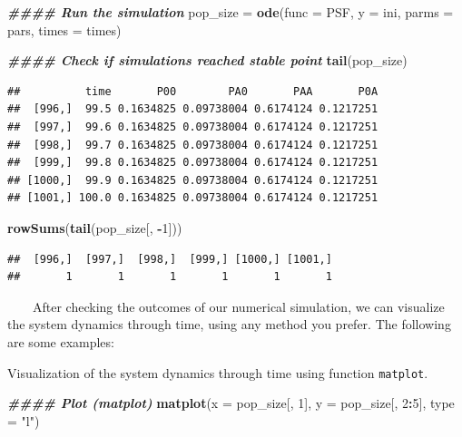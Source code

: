 \documentclass[
]{book}
\newenvironment{Shaded}{\begin{snugshade}}{\end{snugshade}}
\newcommand{\AttributeTok}[1]{\textcolor[rgb]{0.13,0.29,0.53}{#1}}
\newcommand{\DecValTok}[1]{\textcolor[rgb]{0.00,0.00,0.81}{#1}}
\newcommand{\DocumentationTok}[1]{\textcolor[rgb]{0.56,0.35,0.01}{\textbf{\textit{#1}}}}
\newcommand{\FunctionTok}[1]{\textcolor[rgb]{0.13,0.29,0.53}{\textbf{#1}}}
\newcommand{\NormalTok}[1]{#1}
\newcommand{\OtherTok}[1]{\textcolor[rgb]{0.56,0.35,0.01}{#1}}
\newcommand{\SpecialCharTok}[1]{\textcolor[rgb]{0.81,0.36,0.00}{\textbf{#1}}}
\newcommand{\StringTok}[1]{\textcolor[rgb]{0.31,0.60,0.02}{#1}}
\begin{document}
\begin{Shaded}
\begin{Highlighting}[]
\DocumentationTok{\#\#\#\# Run the simulation}
\NormalTok{pop\_size }\OtherTok{=} \FunctionTok{ode}\NormalTok{(}\AttributeTok{func =}\NormalTok{ PSF, }\AttributeTok{y =}\NormalTok{ ini, }\AttributeTok{parms =}\NormalTok{ pars, }\AttributeTok{times =}\NormalTok{ times)}


\DocumentationTok{\#\#\#\# Check if simulations reached stable point }
\FunctionTok{tail}\NormalTok{(pop\_size)}
\end{Highlighting}
\end{Shaded}

\begin{verbatim}
##          time       P00        PA0       PAA       P0A
##  [996,]  99.5 0.1634825 0.09738004 0.6174124 0.1217251
##  [997,]  99.6 0.1634825 0.09738004 0.6174124 0.1217251
##  [998,]  99.7 0.1634825 0.09738004 0.6174124 0.1217251
##  [999,]  99.8 0.1634825 0.09738004 0.6174124 0.1217251
## [1000,]  99.9 0.1634825 0.09738004 0.6174124 0.1217251
## [1001,] 100.0 0.1634825 0.09738004 0.6174124 0.1217251
\end{verbatim}

\begin{Shaded}
\begin{Highlighting}[]
\FunctionTok{rowSums}\NormalTok{(}\FunctionTok{tail}\NormalTok{(pop\_size[, }\SpecialCharTok{{-}}\DecValTok{1}\NormalTok{]))}
\end{Highlighting}
\end{Shaded}

\begin{verbatim}
##  [996,]  [997,]  [998,]  [999,] [1000,] [1001,] 
##       1       1       1       1       1       1
\end{verbatim}

~~~~After checking the outcomes of our numerical simulation, we can visualize the system dynamics through time, using any method you prefer. The following are some examples:

Visualization of the system dynamics through time using function \texttt{matplot}.

\begin{Shaded}
\begin{Highlighting}[]
\DocumentationTok{\#\#\#\# Plot (matplot)}
\FunctionTok{matplot}\NormalTok{(}\AttributeTok{x =}\NormalTok{ pop\_size[, }\DecValTok{1}\NormalTok{], }\AttributeTok{y =}\NormalTok{ pop\_size[, }\DecValTok{2}\SpecialCharTok{:}\DecValTok{5}\NormalTok{], }\AttributeTok{type =} \StringTok{"l"}\NormalTok{)}
\end{Highlighting}
\end{Shaded}
\end{document}
